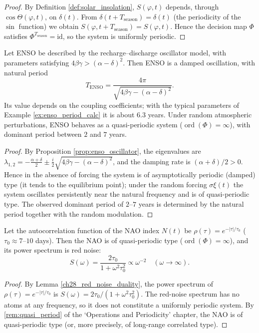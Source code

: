 \begin{proof}
By Definition \ref{def:solar_insolation}, $S(\varphi,t)$ depends, through $\cos\Theta(\varphi,t)$, on $\delta(t)$. From $\delta(t+T_{\text{season}})=\delta(t)$ (the periodicity of the $\sin$ function) we obtain $S(\varphi,t+T_{\text{season}})=S(\varphi,t)$. Hence the decision map $\Phi$ satisfies $\Phi^{T_{\text{season}}}=\mathrm{id}$, so the system is uniformly periodic.
\end{proof}

\begin{lemma}\label{lem:enso_quasiperiodic}
Let ENSO be described by the recharge--discharge oscillator model, with parameters satisfying $4\beta\gamma > (\alpha-\delta)^2$. Then ENSO is a damped oscillation, with natural period
\[
T_{\text{ENSO}} = \frac{4\pi}{\sqrt{4\beta\gamma - (\alpha-\delta)^2}}.
\]
Its value depends on the coupling coefficients; with the typical parameters of Example \ref{ex:enso_period_calc} it is about $6.3$ years.
Under random atmospheric perturbations, ENSO behaves as a quasi-periodic system ($\operatorname{ord}(\Phi)=\infty$), with dominant period between $2$ and $7$ years.
\end{lemma}

\begin{proof}
By Proposition \ref{prop:enso_oscillator}, the eigenvalues are $\lambda_{1,2}=-\frac{\alpha+\delta}{2}\pm \frac{i}{2}\sqrt{4\beta\gamma-(\alpha-\delta)^2}$, and the damping rate is $(\alpha+\delta)/2>0$. Hence in the absence of forcing the system is of asymptotically periodic (damped) type (it tends to the equilibrium point); under the random forcing $\sigma\xi(t)$ the system oscillates persistently near the natural frequency and is of quasi-periodic type. The observed dominant period of $2$--$7$ years is determined by the natural period together with the random modulation.
\end{proof}

\begin{lemma}\label{lem:nao_red_noise}
Let the autocorrelation function of the NAO index $N(t)$ be $\rho(\tau)=e^{-|\tau|/\tau_0}$ ($\tau_0\approx7$--$10$ days). Then the NAO is of quasi-periodic type ($\operatorname{ord}(\Phi)=\infty$), and its power spectrum is red noise:
\[
S(\omega)=\frac{2\tau_0}{1+\omega^2\tau_0^2}\propto\omega^{-2}\quad(\omega\to\infty).
\]
\end{lemma}

\begin{proof}
By Lemma \ref{ch28_red_noise_duality}, the power spectrum of $\rho(\tau)=e^{-|\tau|/\tau_0}$ is $S(\omega)=2\tau_0/(1+\omega^2\tau_0^2)$. The red-noise spectrum has no atoms at any frequency, so it does not constitute a uniformly periodic system. By \cref{rem:quasi_period} of the `Operations and Periodicity' chapter, the NAO is of quasi-periodic type (or, more precisely, of long-range correlated type).
\end{proof}

